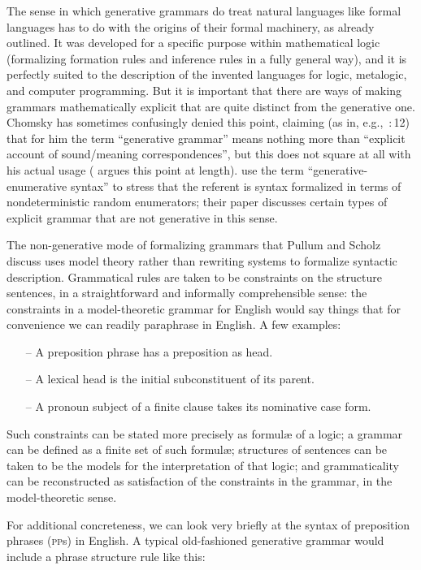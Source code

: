 \documentclass[output=paper]{langscibook}
\begin{document}
The sense in which generative grammars do treat natural languages like formal languages has to do with the origins of their formal machinery, as already outlined.  It was developed for a specific purpose within mathematical logic (formalizing formation rules and inference rules in a fully general way), and it is perfectly suited to the description of the invented languages for logic, metalogic, and computer programming.  But it is important that there are ways of making grammars mathematically explicit that are quite distinct from the generative one.  Chomsky has sometimes confusingly denied this point, claiming (as in, e.g.,\ \citealt{Chomsky66Topics}:\,12) that for him the term ``generative grammar'' means nothing more than ``explicit account of sound/meaning correspondences'', but this does not square at all with his actual usage (\citealt{Ney93} argues this point at length). \citet{PullScho01LACL} use the term ``generative-enumerative syntax'' to stress that the referent is syntax formalized in terms of nondeterministic random enumerators; their paper discusses certain types of explicit grammar that are not generative in this sense.

The non-generative mode of formalizing grammars that Pullum and Scholz discuss uses model theory rather than rewriting systems to formalize syntactic description. Grammatical rules are taken to be constraints on the structure sentences, in a straightforward and informally comprehensible sense: the constraints in a model-theoretic grammar for English would say things that for convenience we can readily paraphrase in English. A few examples:

\begin{itemize} 
\item[--] A preposition phrase has a preposition as head. 
\item[--] A lexical head is the initial subconstituent of its parent. 
\item[--] A pronoun subject of a finite clause takes its nominative case form. 
\end{itemize} 

Such constraints can be stated more precisely as formul{\ae} of a logic; a grammar can be defined as a finite set of such formul{\ae}; structures of sentences can be taken to be the models for the interpretation of that logic; and grammaticality can be reconstructed as satisfaction of the constraints in the grammar, in the model-theoretic sense.

For additional concreteness, we can look very briefly at the syntax of preposition phrases (\textsc{pp}s) in English.  A typical old-fashioned generative grammar would include a phrase structure rule like this:
\end{document}
